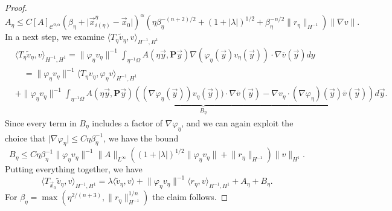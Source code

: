\documentclass[a4paper,reqno]{amsart}
\numberwithin{equation}{section}
\numberwithin{equation}{section}		%
\numberwithin{figure}{section}			%
\numberwithin{table}{section}				%
\theoremstyle{definition}
\renewcommand{\tilde}{\widetilde}
\newcommand{\<}{\ensuremath \leq}
\renewcommand{\>}{\ensuremath \geq}
\renewcommand{\tilde}{\widetilde}
\begin{document}
\begin{proof}
    \begin{equation}
        A_\eta \leq C[A]_{\mathcal{C}^{0,\alpha}}(\beta_\eta + \lvert \vec{x}_{i(\eta)}^\eta-\vec{x}_0\rvert)^\alpha(\eta\beta_\eta^{-(n+2)/2} + (1 + \lvert \lambda\rvert)^{1/2}+ \beta_\eta^{-n/2}\lVert r_\eta\rVert_{H^{-1}})\lVert\nabla  v\rVert.
    \end{equation}
    In a next step, we examine $\langle T_{\eta}\tilde{v}_\eta,v \rangle_{H^{-1},H^{1}}$
    \begin{equation}
        \begin{aligned}
            &\langle T_{\eta}\tilde{v}_\eta,v \rangle_{H^{-1},H^{1}}=\lVert \varphi_\eta v_\eta\rVert^{-1}\int_{\eta^{-1}\Omega}A\left( \eta\vec{y}, \textbf{P}\vec{y}\right)\nabla  (\varphi_\eta(\vec{y})v_\eta(\vec{y})) \cdot \nabla \overline{v}(\vec{y})dy\\
            &\quad =\lVert \varphi_\eta v_\eta\rVert^{-1}\langle T_{\eta}v_\eta,
            \varphi_\eta v \rangle_{H^{-1},H^{1}}\\
            & + \underbrace{\lVert \varphi_\eta v_\eta\rVert^{-1}\int_{\eta^{-1}\Omega}A\left( \eta\vec{y}, \textbf{P}\vec{y}\right) \left((\nabla  \varphi_\eta(\vec{y}))v_\eta(\vec{y})) \cdot \nabla \overline{v}(\vec{y}) - \nabla v_\eta \cdot (\nabla \varphi_\eta)(\vec{y})\overline{v}(\vec{y})\right)d\vec{y}}_{B_\eta}.
        \end{aligned}
    \end{equation}
    Since every term in $B_\eta$ includes a factor of $\nabla \varphi_\eta$, and we can again exploit the choice that $\lvert \nabla \varphi_\eta\rvert \leq C\eta\beta_\eta^{-1}$, we have the bound
    \begin{equation}
        B_\eta\leq  C\eta\beta_\eta^{-1}\lVert \varphi_\eta v_\eta\rVert^{-1} \lVert A\rVert_{L^\infty}((1+\lvert \lambda \rvert)^{1/2}\lVert \varphi_\eta v_\eta\rVert + \lVert r_\eta\rVert_{H^{-1}})\lVert v\rVert_{H^1}.
    \end{equation}
    Putting everything together, we have
    \begin{equation}
        \langle T_{\vec{x}_0}\tilde{v}_\eta,v \rangle_{H^{-1},H^{1}} = \lambda \langle \tilde{v}_\eta,v \rangle + \lVert \varphi_\eta v_\eta\rVert^{-1}\langle r_\eta,v\rangle_{H^{-1},H^1}+ A_\eta + B_\eta.
    \end{equation}
    For $\beta_\eta = \max(\eta^{2/(n+3)}, \lVert r_\eta\rVert_{H^{-1}}^{1/n})$ the claim follows.
\end{proof}
\end{document}
